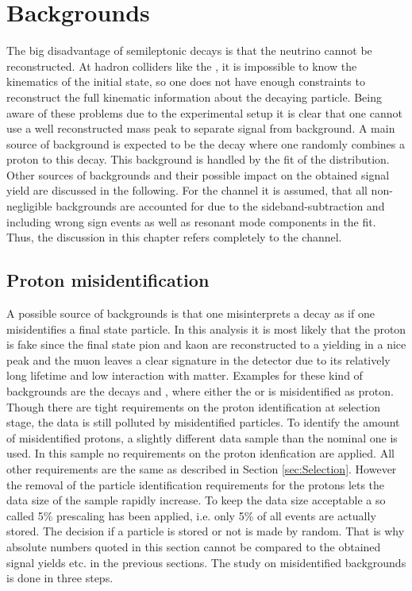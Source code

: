 \chapter{Backgrounds}
\label{sec:Backgrounds}
The big disadvantage of semileptonic decays is that the neutrino cannot be reconstructed.
At hadron colliders like the \lhc, it is impossible to know the kinematics of the initial state, so one does not have enough constraints to reconstruct the full kinematic information about the decaying particle.
Being aware of these problems due to the experimental setup it is clear that one cannot use a well reconstructed \Lb mass peak to separate signal from background.
A main source of background is expected to be the decay  where one randomly combines a proton to this decay.
This background is handled by the fit of the \logIP distribution.
Other sources of backgrounds and their possible impact on the obtained signal yield \NDp are discussed in the following.
For the \LbToLcmunu channel it is assumed, that all non-negligible backgrounds are accounted for due to the sideband-subtraction and including wrong sign events as well as resonant mode components in the fit.
Thus, the discussion in this chapter refers completely to the \LbToDpmunuX channel.

\section{Proton misidentification}
\label{sec:BKG_misIDp}
A possible source of backgrounds is that one misinterprets a decay as \LbToDpmunuX if one misidentifies a final state particle.
In this analysis it is most likely that the proton is fake since the final state pion and kaon are reconstructed to a \Dz yielding in a nice peak and the muon leaves a clear signature in the detector due to its relatively long lifetime and low interaction with matter.
Examples for these kind of backgrounds are the decays  and , where either the \Kp or \pip is misidentified as proton.
Though there are tight requirements on the proton identification at selection stage, the data is still polluted by misidentified particles.
To identify the amount of misidentified protons, a slightly different data sample than the nominal one is used. 
In this sample no requirements on the proton idenfication are applied.
All other requirements are the same as described in Section \ref{sec:Selection}.
However the removal of the particle identification requirements for the protons lets the data size of the sample rapidly increase.
To keep the data size acceptable a so called 5\% prescaling has been applied, i.e. only 5\% of all events are actually stored.
The decision if a particle is stored or not is made by random.
That is why absolute numbers quoted in this section cannot be compared to the obtained signal yields etc. in the previous sections.
The study on misidentified backgrounds is done in three steps.


